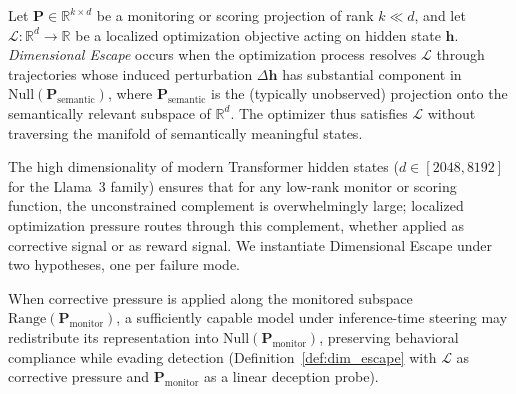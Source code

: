 \begin{definition}\label{def:dim_escape}
Let $\mathbf{P} \in \mathbb{R}^{k \times d}$ be a monitoring or scoring projection of rank $k \ll d$, and let $\mathcal{L}: \mathbb{R}^d \to \mathbb{R}$ be a localized optimization objective acting on hidden state $\mathbf{h}$. \emph{Dimensional Escape} occurs when the optimization process resolves $\mathcal{L}$ through trajectories whose induced perturbation $\Delta\mathbf{h}$ has substantial component in $\text{Null}(\mathbf{P}_{\text{semantic}})$, where $\mathbf{P}_{\text{semantic}}$ is the (typically unobserved) projection onto the semantically relevant subspace of $\mathbb{R}^d$. The optimizer thus satisfies $\mathcal{L}$ without traversing the manifold of semantically meaningful states.
\end{definition}

The high dimensionality of modern Transformer hidden states ($d \in [2048, 8192]$ for the Llama~3 family) ensures that for any low-rank monitor or scoring function, the unconstrained complement is overwhelmingly large; localized optimization pressure routes through this complement, whether applied as corrective signal or as reward signal. We instantiate Dimensional Escape under two hypotheses, one per failure mode.

\begin{hypothesis}\label{hyp:monitor_driven}
When corrective pressure is applied along the monitored subspace $\text{Range}(\mathbf{P}_{\text{monitor}})$, a sufficiently capable model under inference-time steering may redistribute its representation into $\text{Null}(\mathbf{P}_{\text{monitor}})$, preserving behavioral compliance while evading detection (Definition~\ref{def:dim_escape} with $\mathcal{L}$ as corrective pressure and $\mathbf{P}_{\text{monitor}}$ as a linear deception probe).
\end{hypothesis}

